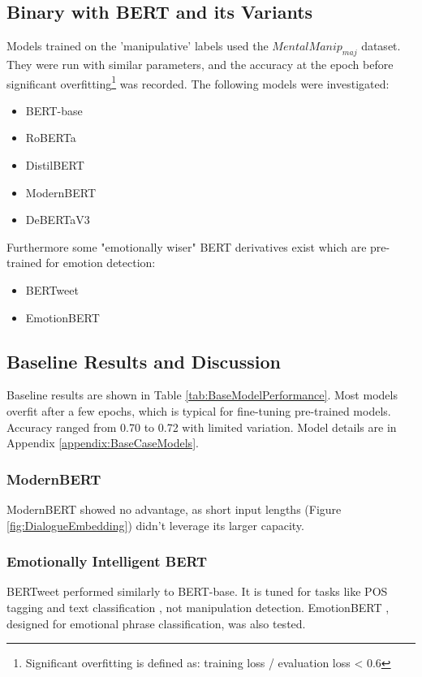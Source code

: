 \documentclass[
	letterpaper, %
	12pt, %
	unnumberedsections, %
	twoside, %
]{LTJournalArticle}
\begin{document}
\subsection{Binary with BERT and its Variants}
Models trained on the 'manipulative' labels used the $MentalManip_{maj}$ dataset. They were run with similar parameters, and the accuracy at the epoch before significant overfitting\footnote{Significant overfitting is defined as: training loss / evaluation loss < 0.6} was recorded. The following models were investigated:

\begin{itemize}
	\item BERT-base \cite{BERT-base}
	\item RoBERTa \cite{RoBERTa}
	\item DistilBERT \cite{DistilBERT}
	\item ModernBERT \cite{ModernBERT}
	\item DeBERTaV3 \cite{DeBERTaV3}
\end{itemize}
Furthermore some "emotionally wiser" BERT derivatives exist which are pre-trained for emotion detection:
\begin{itemize}
	\item BERTweet \cite{BERTweet}
	\item EmotionBERT \cite{EmotionBERT}
\end{itemize}

\subsection{Baseline Results and Discussion}\label{sec:BaselineResults}

Baseline results are shown in Table \ref{tab:BaseModelPerformance}. Most models overfit after a few epochs, which is typical for fine-tuning pre-trained models. Accuracy ranged from 0.70 to 0.72 with limited variation. Model details are in Appendix \ref{appendix:BaseCaseModels}.

\subsubsection{ModernBERT}
ModernBERT showed no advantage, as short input lengths (Figure \ref{fig:DialogueEmbedding}) didn't leverage its larger capacity.

\subsubsection{Emotionally Intelligent BERT}
BERTweet performed similarly to BERT-base. It is tuned for tasks like POS tagging and text classification \cite{BERTweet}, not manipulation detection. EmotionBERT \cite{EmotionBERT}, designed for emotional phrase classification, was also tested.
\end{document}
